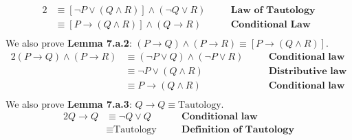 \begin{enumerate}[label=(\alph*)]
\begin{alignat*}{2}
        &\equiv [\neg P \vee (Q \wedge R)] \wedge (\neg Q \vee R) && \quad \textbf{Law of Tautology}\\
        &\equiv [P \rightarrow (Q \wedge R)] \wedge (Q \rightarrow R) && \quad \textbf{Conditional Law}\\
    \end{alignat*}
    We also prove \textbf{Lemma 7.a.2}: $(P \rightarrow Q) \wedge (P \rightarrow R) \equiv [P \rightarrow (Q \wedge R)]$.
    \begin{alignat*}{2}
        (P \rightarrow Q) \wedge (P \rightarrow R) &\equiv (\neg P \vee Q) \wedge (\neg P \vee R) && \quad \textbf{Conditional law}\\
        &\equiv \neg P \vee (Q \wedge R) && \quad \textbf{Distributive law}\\
        &\equiv P \rightarrow (Q \wedge R) && \quad \textbf{Conditional law}\\
    \end{alignat*}
    We also prove \textbf{Lemma 7.a.3}: $Q \rightarrow Q \equiv \text{Tautology}$.
    \begin{alignat*}{2}
        Q \rightarrow Q &\equiv \neg Q \vee Q && \quad \textbf{Conditional law}\\
        &\equiv \text{Tautology} && \quad \textbf{Definition of Tautology}\\
    \end{alignat*}
    \pagebreak


\end{enumerate}
